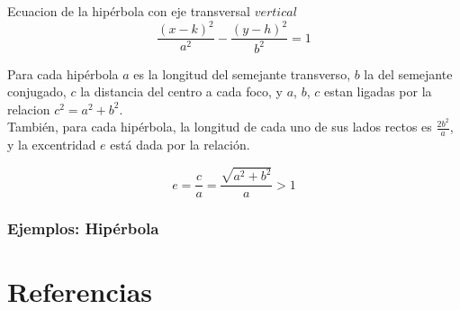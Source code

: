 \documentclass[12pt,a4paper]{article} %
\begin{document}
Ecuacion de la hipérbola con eje transversal $vertical$
$$ {\frac{(x - k)^2}{a^2} - \frac{(y - h)^2}{b^2} = 1} $$

Para cada hipérbola $a$ es la longitud del semejante transverso, $b$ la del semejante conjugado, $c$ la distancia del centro a cada foco, y $a$, $b$, $c$ estan ligadas por la relacion $c^2 = a^2 + b^2$.
\\También, para cada hipérbola, la longitud de cada uno de sus lados rectos es $\frac{2b^2}{a}$, y la excentridad $e$ está dada por la relación.

$$e = \frac{c}{a} = \frac{\sqrt{a^2 + b^2}}{a} > 1$$

\newpage

\subsubsection{Ejemplos: Hipérbola}


\newpage

\section{Referencias}



\end{document}
